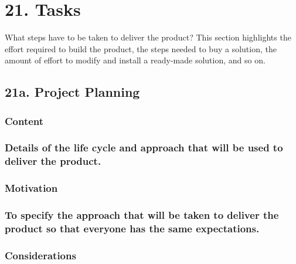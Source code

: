 \documentclass[
]{article}
\begin{document}
\hypertarget{tasks}{%
\section{21. Tasks}\label{tasks}}

What steps have to be taken to deliver the product? This section
highlights the effort required to build the product, the steps needed to
buy a solution, the amount of effort to modify and install a ready-made
solution, and so on.

\hypertarget{a.-project-planning}{%
\subsection{21a. Project Planning}\label{a.-project-planning}}

\hypertarget{content-69}{%
\subsubsection{Content}\label{content-69}}

\hypertarget{details-of-the-life-cycle-and-approach-that-will-be-used-to-deliver-the-product.}{%
\subsubsection{\texorpdfstring{Details of the life cycle and approach
that will be used to deliver the product.
}{Details of the life cycle and approach that will be used to deliver the product. }}\label{details-of-the-life-cycle-and-approach-that-will-be-used-to-deliver-the-product.}}

\hypertarget{motivation-68}{%
\subsubsection{Motivation}\label{motivation-68}}

\hypertarget{to-specify-the-approach-that-will-be-taken-to-deliver-the-product-so-that-everyone-has-the-same-expectations.}{%
\subsubsection{To specify the approach that will be taken to deliver the
product so that everyone has the same
expectations.}\label{to-specify-the-approach-that-will-be-taken-to-deliver-the-product-so-that-everyone-has-the-same-expectations.}}

\hypertarget{considerations-50}{%
\subsubsection{Considerations}\label{considerations-50}}
\end{document}
